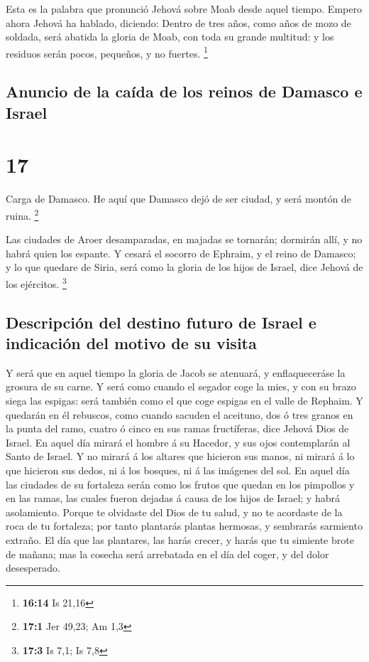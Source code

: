  Esta es la palabra que pronunció Jehová sobre Moab desde
aquel tiempo.  Empero ahora Jehová ha hablado, diciendo:
Dentro de tres años, como años de mozo de soldada, será abatida la
gloria de Moab, con toda su grande multitud: y los residuos serán pocos,
pequeños, y no fuertes. \footnote{\textbf{16:14} Is 21,16}

\hypertarget{anuncio-de-la-cauxedda-de-los-reinos-de-damasco-e-israel}{%
\subsection{Anuncio de la caída de los reinos de Damasco e
Israel}\label{anuncio-de-la-cauxedda-de-los-reinos-de-damasco-e-israel}}

\hypertarget{section-16}{%
\section{17}\label{section-16}}

 Carga de Damasco. He aquí que Damasco dejó de ser ciudad, y
será montón de ruina. \footnote{\textbf{17:1} Jer 49,23; Am 1,3}

 Las ciudades de Aroer desamparadas, en majadas se tornarán;
dormirán allí, y no habrá quien los espante.  Y cesará el
socorro de Ephraim, y el reino de Damasco; y lo que quedare de Siria,
será como la gloria de los hijos de Israel, dice Jehová de los
ejércitos. \footnote{\textbf{17:3} Is 7,1; Is 7,8}

\hypertarget{descripciuxf3n-del-destino-futuro-de-israel-e-indicaciuxf3n-del-motivo-de-su-visita}{%
\subsection{Descripción del destino futuro de Israel e indicación del
motivo de su
visita}\label{descripciuxf3n-del-destino-futuro-de-israel-e-indicaciuxf3n-del-motivo-de-su-visita}}

 Y será que en aquel tiempo la gloria de Jacob se atenuará,
y enflaqueceráse la grosura de su carne.  Y será como cuando
el segador coge la mies, y con su brazo siega las espigas: será también
como el que coge espigas en el valle de Rephaim.  Y quedarán
en él rebuscos, como cuando sacuden el aceituno, dos ó tres granos en la
punta del ramo, cuatro ó cinco en sus ramas fructíferas, dice Jehová
Dios de Israel.  En aquel día mirará el hombre á su Hacedor,
y sus ojos contemplarán al Santo de Israel.  Y no mirará á
los altares que hicieron sus manos, ni mirará á lo que hicieron sus
dedos, ni á los bosques, ni á las imágenes del sol.  En
aquel día las ciudades de su fortaleza serán como los frutos que quedan
en los pimpollos y en las ramas, las cuales fueron dejadas á causa de
los hijos de Israel; y habrá asolamiento.  Porque te
olvidaste del Dios de tu salud, y no te acordaste de la roca de tu
fortaleza; por tanto plantarás plantas hermosas, y sembrarás sarmiento
extraño.  El día que las plantares, las harás crecer, y
harás que tu simiente brote de mañana; mas la cosecha será arrebatada en
el día del coger, y del dolor desesperado.

